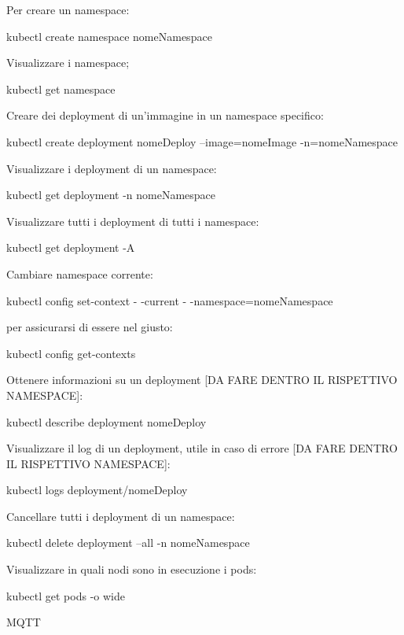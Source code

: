 \documentclass[
]{article}
\begin{document}
{Per creare un namespace:}

{kubectl create namespace nomeNamespace}

{}

{}

{Visualizzare i namespace;}

{kubectl get namespace}

{}

{}

{Creare dei deployment di un'immagine in un namespace specifico:}

{kubectl create deployment nomeDeploy --image=nomeImage
-n=nomeNamespace}

{}

{}

{Visualizzare i deployment di un namespace:}

{kubectl get deployment -n nomeNamespace}

{}

{}

{Visualizzare tutti i deployment di tutti i namespace:}

{kubectl get deployment -A}

{}

{}

{Cambiare namespace corrente:}

{kubectl config set-context - -current - -namespace=nomeNamespace}

{per assicurarsi di essere nel giusto:}

{kubectl config get-contexts}

{}

{}

{Ottenere informazioni su un deployment {[}}{DA FARE DENTRO IL
RISPETTIVO NAMESPACE}{{]}:}

{kubectl describe deployment nomeDeploy}

{}

{}

{Visualizzare il log di un deployment, utile in caso di errore {[}}{DA
FARE DENTRO IL RISPETTIVO NAMESPACE}{{]}:}

{kubectl logs deployment/nomeDeploy}

{}

{}

{Cancellare tutti i deployment di un namespace:}

{kubectl delete deployment --all -n nomeNamespace}

{}

{}

{Visualizzare in quali nodi sono in esecuzione }{i pods:}

{kubectl get pods -o wide}

{}

{MQTT}

{}
\end{document}
